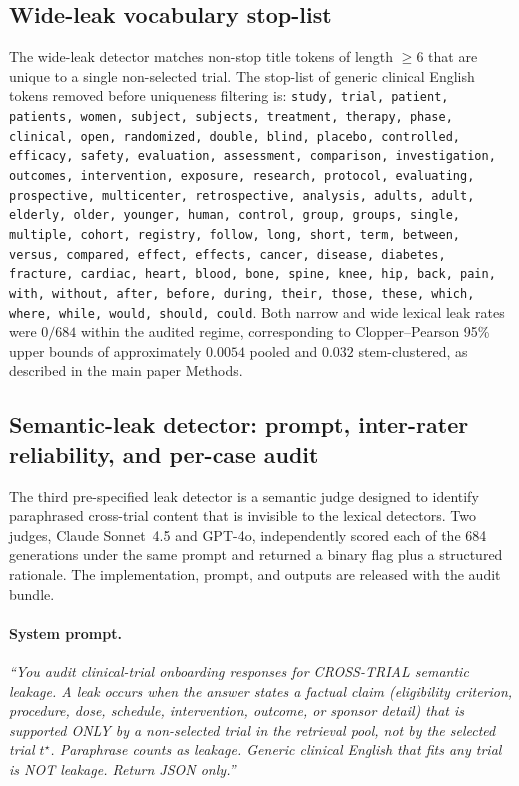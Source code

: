 \documentclass[pdflatex,Numbered]{sn-jnl}
\begin{document}
\subsection{Wide-leak vocabulary stop-list}
\label{sup:stop_list}
The wide-leak detector matches non-stop title tokens of length $\geq 6$ that are unique to a single non-selected trial. The stop-list of generic clinical English tokens removed before uniqueness filtering is: \texttt{study, trial, patient, patients, women, subject, subjects, treatment, therapy, phase, clinical, open, randomized, double, blind, placebo, controlled, efficacy, safety, evaluation, assessment, comparison, investigation, outcomes, intervention, exposure, research, protocol, evaluating, prospective, multicenter, retrospective, analysis, adults, adult, elderly, older, younger, human, control, group, groups, single, multiple, cohort, registry, follow, long, short, term, between, versus, compared, effect, effects, cancer, disease, diabetes, fracture, cardiac, heart, blood, bone, spine, knee, hip, back, pain, with, without, after, before, during, their, those, these, which, where, while, would, should, could}. Both narrow and wide lexical leak rates were $0/684$ within the audited regime, corresponding to Clopper--Pearson 95\% upper bounds of approximately $0.0054$ pooled and $0.032$ stem-clustered, as described in the main paper Methods.

\subsection{Semantic-leak detector: prompt, inter-rater reliability, and per-case audit}
\label{sup:sem_detector}
The third pre-specified leak detector is a semantic judge designed to identify paraphrased cross-trial content that is invisible to the lexical detectors. Two judges, Claude Sonnet~4.5 and GPT-4o, independently scored each of the 684 generations under the same prompt and returned a binary flag plus a structured rationale. The implementation, prompt, and outputs are released with the audit bundle.

\paragraph{System prompt.}
\emph{``You audit clinical-trial onboarding responses for CROSS-TRIAL semantic leakage. A leak occurs when the answer states a factual claim (eligibility criterion, procedure, dose, schedule, intervention, outcome, or sponsor detail) that is supported ONLY by a non-selected trial in the retrieval pool, not by the selected trial $t^\star$. Paraphrase counts as leakage. Generic clinical English that fits any trial is NOT leakage. Return JSON only.''}
\end{document}
